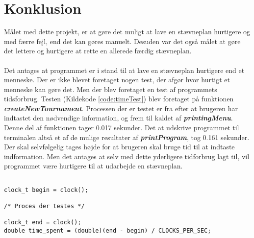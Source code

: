 \chapter{Konklusion}\label{ch:conclusion}
Målet med dette projekt, er at gøre det muligt at lave en stævneplan hurtigere og med færre fejl, end det kan gøres manuelt. Desuden var det også målet at gøre det lettere og hurtigere at rette en allerede færdig stævneplan. 
\\\\
Det antages at programmet er i stand til at lave en stævneplan hurtigere end et menneske. Der er ikke blevet foretaget nogen test, der afgør hvor hurtigt et menneske kan gøre det. Men der blev foretaget en test af programmets tidsforbrug. 
Testen (Kildekode \ref{code:timeTest}) blev foretaget på funktionen \textbf{\textit{createNewTournament}}. Processen der er testet er fra efter at brugeren har indtastet den nødvendige information, og frem til kaldet af \textbf{\textit{printingMenu}}. Denne del af funktionen tager 0.017 sekunder. Det at udskrive programmet til terminalen altså et af de mulige resultater af \textbf{\textit{printProgram}}, tog 0.161 sekunder. 
Der skal selvfølgelig tages højde for at brugeren skal bruge tid til at indtaste indformation. Men det antages at selv med dette yderligere tidforbrug lagt til, vil programmet være hurtigere til at udarbejde en stævneplan.

\begin{listing}
\begin{verbatim}

clock_t begin = clock();

/* Proces der testes */

clock_t end = clock();
double time_spent = (double)(end - begin) / CLOCKS_PER_SEC;

\end{verbatim}
\label{code:timeTest}
\end{listing}

